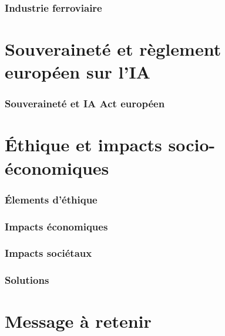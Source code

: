 \begin{bibliographysection}
\section{Industrie ferroviaire}
\localized

\part[subtitle={Le point de vue d'un technologue}]{Souveraineté et règlement européen sur l'IA}

\section{Souveraineté et IA Act européen}
\localized

\part[subtitle={\'Elements de réflexion}]{\'Ethique et impacts socio-économiques}

\section{\'Elements d'éthique}
\localized
\section{Impacts économiques}
\localized
\localized
\section{Impacts sociétaux}
\localized
\section{Solutions}
\localized

\part{Message à retenir}

\localized

\appendix

\localized

\end{bibliographysection}

\endinput
